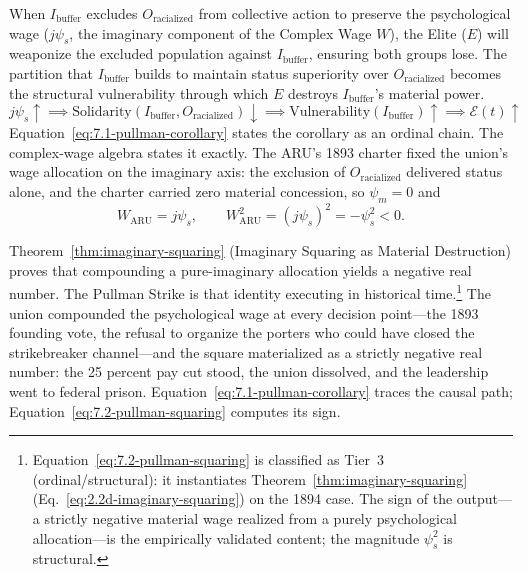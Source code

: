 \begin{keyinsight}
When $I_{\text{buffer}}$ excludes $O_{\text{racialized}}$ from collective action to preserve the psychological wage ($j\psi_s$, the imaginary component of the Complex Wage $W$), the Elite ($E$) will weaponize the excluded population against $I_{\text{buffer}}$, ensuring both groups lose. The partition that $I_{\text{buffer}}$ builds to maintain status superiority over $O_{\text{racialized}}$ becomes the structural vulnerability through which $E$ destroys $I_{\text{buffer}}$'s material power.
\begin{equation}\label{eq:7.1-pullman-corollary}
j\psi_s \uparrow \implies \text{Solidarity}(I_{\text{buffer}}, O_{\text{racialized}}) \downarrow \implies \text{Vulnerability}(I_{\text{buffer}}) \uparrow \implies \mathcal{E}(t) \uparrow
\end{equation}
Equation~\ref{eq:7.1-pullman-corollary} states the corollary as an ordinal chain. The complex-wage algebra states it exactly. The ARU's 1893 charter fixed the union's wage allocation on the imaginary axis: the exclusion of $O_{\text{racialized}}$ delivered status alone, and the charter carried zero material concession, so $\psi_m = 0$ and
\begin{equation}\label{eq:7.2-pullman-squaring}
W_{\text{ARU}} = j\psi_s, \qquad W_{\text{ARU}}^2 = (j\psi_s)^2 = -\psi_s^2 < 0.
\end{equation}
\end{keyinsight}

Theorem~\ref{thm:imaginary-squaring} (Imaginary Squaring as Material Destruction) proves that compounding a pure-imaginary allocation yields a negative real number. The Pullman Strike is that identity executing in historical time.\footnote{Equation~\ref{eq:7.2-pullman-squaring} is classified as Tier~3 (ordinal/structural): it instantiates Theorem~\ref{thm:imaginary-squaring} (Eq.~\ref{eq:2.2d-imaginary-squaring}) on the 1894 case. The sign of the output---a strictly negative material wage realized from a purely psychological allocation---is the empirically validated content; the magnitude $\psi_s^2$ is structural.} The union compounded the psychological wage at every decision point---the 1893 founding vote, the refusal to organize the porters who could have closed the strikebreaker channel---and the square materialized as a strictly negative real number: the 25 percent pay cut stood, the union dissolved, and the leadership went to federal prison. Equation~\ref{eq:7.1-pullman-corollary} traces the causal path; Equation~\ref{eq:7.2-pullman-squaring} computes its sign.

